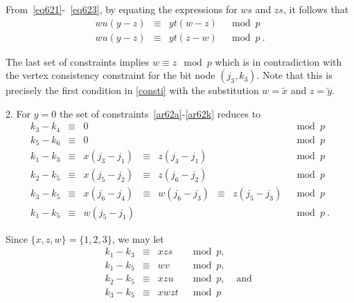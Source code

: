 From~\eqref{eq621}-~\eqref{eq623}, by equating the expressions for
$ws$ and $zs$, it follows that
\begin{equation}\begin{array}{cccc}
wu(y-z) &\equiv &yt(w-z) &\mod p \\
wu(y-z) &\equiv &yt(z-w) &\mod p~.
\end{array}\end{equation}

The last set of constraints implies $w\equiv z \mod p$ which is in
contradiction with the vertex consistency constraint for the bit
node $(j_3,k_3)$. Note that this is precisely the first condition
in \eqref{consti} with the substitution $w=\tilde{x}$ and
$z=\tilde{y}$.

2. For $y=0$ the set of constraints~\eqref{ar62a}-\eqref{ar62k}
reduces to
\begin{equation}\begin{array}{cccccccccc}
k_3-k_4 &\equiv& 0 & {}& {}&{}&{}&\mod p
\\
k_5-k_6 &\equiv& 0 & {}& {}&{}&{}&\mod p\\
k_1-k_3 &\equiv& x(j_3-j_1)& \equiv& z(j_4-j_1)& {} &{}&\mod p
\\
k_2-k_5 &\equiv& x(j_5-j_2) &\equiv&  z(j_6-j_2) &{}&{} &\mod
p\\
k_3-k_5 &\equiv& x(j_6-j_4) &\equiv& w(j_6-j_3) &
\equiv& z(j_5-j_3)&\mod p\\
k_1-k_5 &\equiv& w(j_5-j_1) & {} & {} &{}&{}&\mod p~.
\end{array}\end{equation}

Since $\{x,z,w\}=\{1,2,3\}$, we may let
\begin{equation}\begin{array}{ccccc}k_1-k_3 &\equiv& xzs &\mod p, &{} \\
k_1-k_5 &\equiv & wv &\mod p, &{}\\ k_2-k_5 &\equiv& xzu &\mod p,
&\text{ and }\\k_3-k_5 &\equiv& xwzt &\mod p&{}
\end{array}\end{equation}

